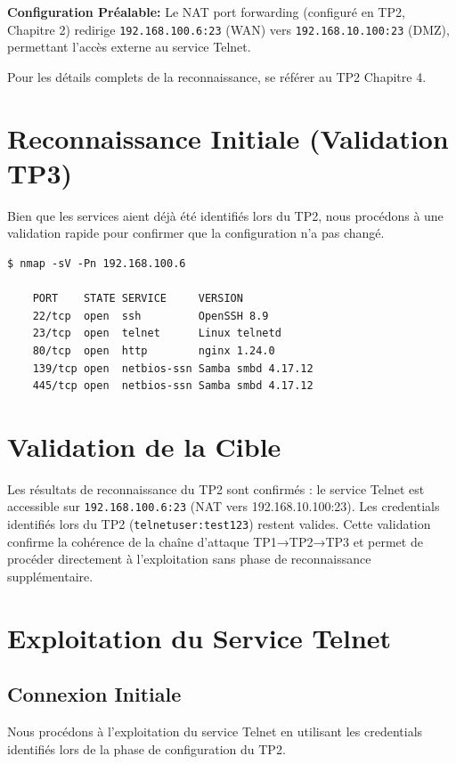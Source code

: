 \documentclass[12pt,a4paper,openany]{report}
\begin{document}
\textbf{Configuration Préalable:} Le NAT port forwarding (configuré en TP2, 
Chapitre 2) redirige \texttt{192.168.100.6:23} (WAN) vers 
\texttt{192.168.10.100:23} (DMZ), permettant l'accès externe au service Telnet.

Pour les détails complets de la reconnaissance, se référer au TP2 Chapitre 4.

\section{Reconnaissance Initiale (Validation TP3)}

Bien que les services aient déjà été identifiés lors du TP2, nous procédons à une validation rapide pour confirmer que la configuration n'a pas changé.

\begin{lstlisting}[caption=Scan Nmap de Validation]
	$ nmap -sV -Pn 192.168.100.6
	
	PORT    STATE SERVICE     VERSION
	22/tcp  open  ssh         OpenSSH 8.9
	23/tcp  open  telnet      Linux telnetd
	80/tcp  open  http        nginx 1.24.0
	139/tcp open  netbios-ssn Samba smbd 4.17.12
	445/tcp open  netbios-ssn Samba smbd 4.17.12
\end{lstlisting}

\section{Validation de la Cible}
	
Les résultats de reconnaissance du TP2 sont confirmés : le service Telnet 
est accessible sur \texttt{192.168.100.6:23} (NAT vers 192.168.10.100:23). 
Les credentials identifiés lors du TP2 (\texttt{telnetuser:test123}) restent 
valides. Cette validation confirme la cohérence de la chaîne d'attaque 
TP1→TP2→TP3 et permet de procéder directement à l'exploitation sans phase 
de reconnaissance supplémentaire.

\section{Exploitation du Service Telnet}

\subsection{Connexion Initiale}

Nous procédons à l'exploitation du service Telnet en utilisant les credentials identifiés lors de la phase de configuration du TP2.
\end{document}
